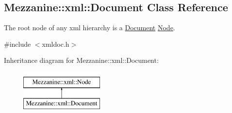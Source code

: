 \hypertarget{classMezzanine_1_1xml_1_1Document}{
\subsection{Mezzanine::xml::Document Class Reference}
\label{classMezzanine_1_1xml_1_1Document}
}


The root node of any xml hierarchy is a \hyperlink{classMezzanine_1_1xml_1_1Document}{Document} \hyperlink{classMezzanine_1_1xml_1_1Node}{Node}.  




{\ttfamily \#include $<$xmldoc.h$>$}

Inheritance diagram for Mezzanine::xml::Document:\begin{figure}[H]
\begin{center}
\leavevmode
\includegraphics[height=2.000000cm]{classMezzanine_1_1xml_1_1Document}
\end{center}
\end{figure}

